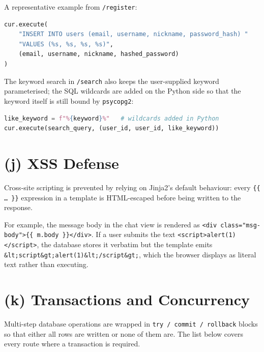 \documentclass[11pt,letterpaper]{article}
\begin{document}
A representative example from \texttt{/register}:

\begin{lstlisting}[language=Python, basicstyle=\ttfamily\small, frame=single, rulecolor=\color{black!20}, backgroundcolor=\color{sqlbg}]
cur.execute(
    "INSERT INTO users (email, username, nickname, password_hash) "
    "VALUES (%s, %s, %s, %s)",
    (email, username, nickname, hashed_password)
)
\end{lstlisting}

The keyword search in \texttt{/search} also keeps the user-supplied keyword
parameterised; the SQL wildcards are added on the Python side so that the
keyword itself is still bound by \texttt{psycopg2}:

\begin{lstlisting}[language=Python, basicstyle=\ttfamily\small, frame=single, rulecolor=\color{black!20}, backgroundcolor=\color{sqlbg}]
like_keyword = f"%{keyword}%"   # wildcards added in Python
cur.execute(search_query, (user_id, user_id, like_keyword))
\end{lstlisting}

\section*{(j) XSS Defense}

Cross-site scripting is prevented by relying on Jinja2's default behaviour:
every \texttt{\{\{ \ldots\ \}\}} expression in a template is HTML-escaped
before being written to the response.

For example, the message body in the chat view is rendered as
\texttt{<div class="msg-body">\{\{ m.body \}\}</div>}. If a user submits the
text \texttt{<script>alert(1)</script>}, the database stores it verbatim but
the template emits
\texttt{\&lt;script\&gt;alert(1)\&lt;/script\&gt;}, which the browser
displays as literal text rather than executing.

\section*{(k) Transactions and Concurrency}

Multi-step database operations are wrapped in \texttt{try / commit / rollback}
blocks so that either all rows are written or none of them are. The list
below covers every route where a transaction is required.
\end{document}
